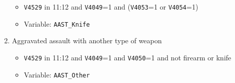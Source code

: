 \documentclass[
]{krantz}
\providecommand{\tightlist}{%
  \setlength{\itemsep}{0pt}\setlength{\parskip}{0pt}}
\begin{document}
\begin{enumerate}
  \begin{itemize}
  \tightlist
  \item
    \texttt{V4529} in 11:12 and \texttt{V4049}=1 and (\texttt{V4053}=1 or \texttt{V4054}=1)
  \item
    Variable: \texttt{AAST\_Knife}
  \end{itemize}
\item
  Aggravated assault with another type of weapon

  \begin{itemize}
  \tightlist
  \item
    \texttt{V4529} in 11:12 and \texttt{V4049}=1 and \texttt{V4050}=1 and not firearm or knife
  \item
    Variable: \texttt{AAST\_Other}
  \end{itemize}
\end{enumerate}
\end{document}
